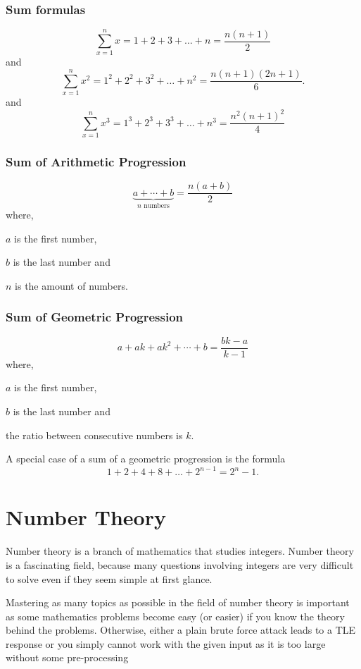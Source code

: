 \documentclass[twoside,12pt,a4paper,english]{book}
\theoremstyle{definition}
\theoremstyle{problemstyle}
\begin{document}
\subsection{Sum formulas}

\[\sum_{x=1}^n x = 1+2+3+\ldots+n = \frac{n(n+1)}{2}\]
and
\[\sum_{x=1}^n x^2 = 1^2+2^2+3^2+\ldots+n^2 = \frac{n(n+1)(2n+1)}{6}.\]
and
\[\sum_{x=1}^n x^3 = 1^3+2^3+3^3+\ldots+n^3 = \frac{n^2(n+1)^2}{4}\]

\subsection{Sum of Arithmetic Progression}

\[\underbrace{a + \cdots + b}_{n \,\, \textrm{numbers}} = \frac{n(a+b)}{2}\]
where,

$a$ is the first number,

$b$ is the last number and

$n$ is the amount of numbers.

\subsection{Sum of Geometric Progression}
\[a + ak + ak^2 + \cdots + b = \frac{bk-a}{k-1}\]
where,

$a$ is the first number,

$b$ is the last number and

the ratio between consecutive numbers is $k$.

A special case of a sum of a geometric progression is the formula
\[1+2+4+8+\ldots+2^{n-1}=2^n-1.\]

\chapter{Number Theory}

Number theory is a branch of mathematics that studies integers. Number
theory is a fascinating field, because many questions involving integers are very
difficult to solve even if they seem simple at first glance.

Mastering as many topics as possible in the field of number theory is important as some
mathematics problems become easy (or easier) if you know the theory behind the problems.
Otherwise, either a plain brute force attack leads to a TLE response or you simply cannot
work with the given input as it is too large without some pre-processing
\end{document}
